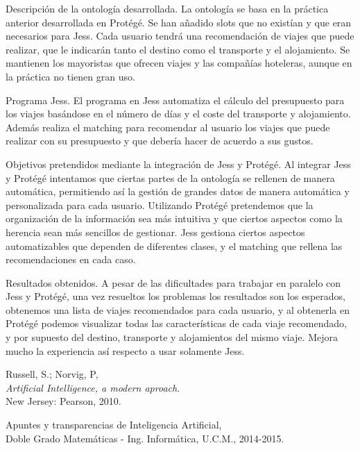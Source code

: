 \documentclass[11pt, a4paper, spanish, openright, twoside]{book}
\begin{document}

\vspace{3cm}


\newpage

\begin{section}{Descripción de la ontología desarrollada.}
	La ontología se basa en la práctica anterior desarrollada en Protégé. Se han añadido slots que no existían y que eran necesarios para Jess. Cada usuario tendrá una recomendación de viajes que puede 
	realizar, que le indicarán tanto el destino como el transporte y el alojamiento. Se mantienen los mayoristas que ofrecen viajes y las compañías hoteleras, aunque en la práctica no tienen gran uso.
	
\end{section}

\begin{section}{Programa Jess.}
	El programa en Jess automatiza el cálculo del presupuesto para los viajes basándose en el número de días y el coste del transporte y alojamiento. Además realiza el matching para recomendar al 
	usuario los viajes que puede realizar con su presupuesto y que debería hacer de acuerdo a sus gustos.
	 
\end{section}

\begin{section}{Objetivos pretendidos mediante la integración de Jess y Protégé.}
	Al integrar Jess y Protégé intentamos que ciertas partes de la ontología se rellenen de manera automática, permitiendo así la gestión de grandes datos de manera automática y personalizada para cada usuario. 
	Utilizando Protégé pretendemos que la organización de la información sea más intuitiva y que ciertos aspectos como la herencia sean más sencillos de gestionar. Jess gestiona ciertos aspectos automatizables que 
	dependen de diferentes clases, y el matching que rellena las recomendaciones en cada caso.
\end{section}

\begin{section}{Resultados obtenidos.}
	A pesar de las dificultades para trabajar en paralelo con Jess y Protégé, una vez resueltos los problemas los resultados son los esperados, obtenemos una lista de viajes recomendados para cada usuario, 
	y al obtenerla en Protégé podemos visualizar todas las características de cada viaje recomendado, y por supuesto del destino, transporte y alojamientos del mismo viaje. Mejora mucho la experiencia así respecto 
	a usar solamente Jess.
\end{section}

	
\begin{thebibliography}{9}

	Russell, S.; Norvig, P, \\
	\emph{Artificial Intelligence, a modern aproach}.\\
	New Jersey: Pearson, 2010.
	
	Apuntes y transparencias de Inteligencia Artificial, \\
	Doble Grado Matemáticas - Ing. Informática, U.C.M., 2014-2015.

\end{thebibliography}
\end{document}
